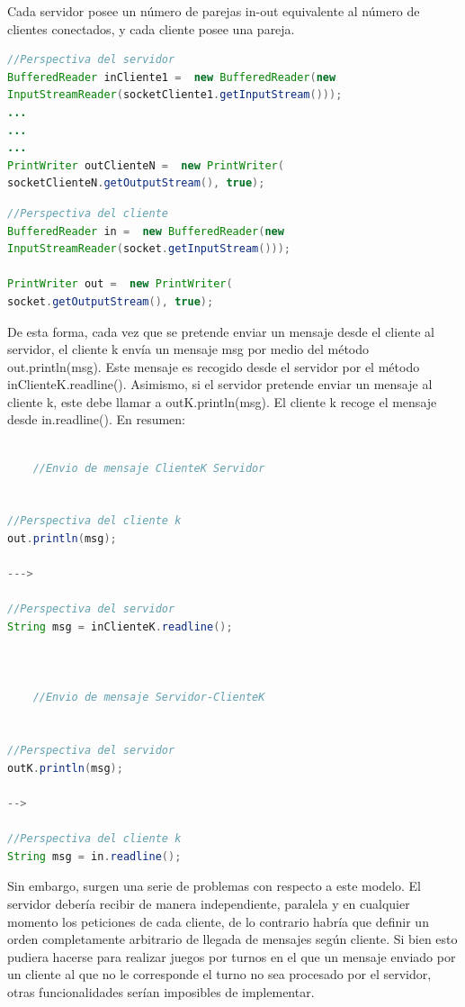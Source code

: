 \documentclass[12pt,a4paper,openright]{book}
\theoremstyle{break}
\begin{document}
Cada servidor posee un número de parejas in-out equivalente al número de clientes conectados, y cada cliente posee una pareja.

\begin{lstlisting}[frame=single, language=Java]
//Perspectiva del servidor
BufferedReader inCliente1 =  new BufferedReader(new
InputStreamReader(socketCliente1.getInputStream()));
...
...
...
PrintWriter outClienteN =  new PrintWriter(
socketClienteN.getOutputStream(), true);
\end{lstlisting}

\begin{lstlisting}[frame=single, language=Java]
//Perspectiva del cliente
BufferedReader in =  new BufferedReader(new
InputStreamReader(socket.getInputStream()));

PrintWriter out =  new PrintWriter(
socket.getOutputStream(), true);
\end{lstlisting}


De esta forma, cada vez que se pretende enviar un mensaje desde el cliente al servidor, el cliente k envía un mensaje msg por medio del método out.println(msg). Este mensaje es recogido desde el servidor por el método inClienteK.readline(). Asimismo, si el servidor pretende enviar un mensaje al cliente k, este debe llamar a outK.println(msg). El cliente k recoge el mensaje desde in.readline(). En resumen:

\begin{lstlisting}[frame=single, language=Java]

	//Envio de mensaje ClienteK Servidor


//Perspectiva del cliente k
out.println(msg);

--->

//Perspectiva del servidor
String msg = inClienteK.readline();



	//Envio de mensaje Servidor-ClienteK


//Perspectiva del servidor
outK.println(msg);

-->

//Perspectiva del cliente k
String msg = in.readline();
\end{lstlisting}

Sin embargo, surgen una serie de problemas con respecto a este modelo. El servidor debería recibir de manera independiente, paralela y en cualquier momento los peticiones de cada cliente, de lo contrario habría que definir un orden completamente arbitrario de llegada de mensajes según cliente. Si bien esto pudiera hacerse para realizar juegos por turnos en el que un mensaje enviado por un cliente al que no le corresponde el turno no sea procesado por el servidor, otras funcionalidades serían imposibles de implementar.
\end{document}
